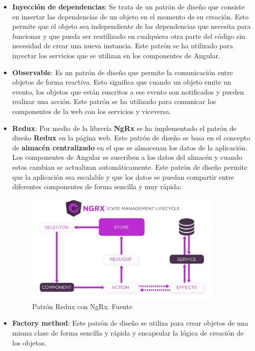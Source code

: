 \begin{itemize}
    \item \textbf{Inyección de dependencias}: Se trata de un patrón de diseño que consiste en insertar las dependencias
    de un objeto en el momento de su creación. Esto permite que el objeto sea independiente de las dependencias que
    necesita para funcionar y que pueda ser reutilizado en cualquiera otra parte del código sin necesidad de crear
    una nueva instancia. Este patrón se ha utilizado para inyectar los servicios que se utilizan
    en los componentes de Angular.

    \item \textbf{Observable}: Es un patrón de diseño que permite la comunicación entre objetos de forma reactiva.
    Esto significa que cuando un objeto emite un evento, los objetos que están suscritos a ese evento son notificados
    y pueden realizar una acción. Este patrón se ha utilizado para comunicar los componentes de la web con
    los servicios y viceversa.

    \newpage

    \item \textbf{Redux}: Por medio de la librería \textbf{NgRx} se ha implementado el patrón de diseño \textbf{Redux} en la
    página web. Este patrón de diseño se basa en el concepto de \textbf{almacén centralizado} en el que se almacenan
    los datos de la aplicación. Los componentes de Angular se suscriben a los datos del almacén y cuando estos cambian
    se actualizan automáticamente. Este patrón de diseño permite que la aplicación sea escalable y que los datos
    se puedan compartir entre diferentes componentes de forma sencilla y muy rápida:
        \begin{figure}[H]
            \centering
            \includegraphics[width=0.9\textwidth]{imgs/ngrx.png}
            \caption{Patrón Redux con NgRx. Fuente~\cite{ngrx}}
            \label{fig:redux}
        \end{figure}
    \item \textbf{Factory method}: Este patrón de diseño se utiliza para crear objetos de una misma clase de forma
    sencilla y rápida y encapsular la lógica de creación de los objetos.


\end{itemize}

